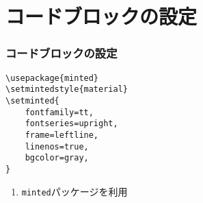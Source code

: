 \section{コードブロックの設定}
\begin{frame}[fragile]
    \frametitle{コードブロックの設定}
    \begin{verbatim}
\usepackage{minted}
\setmintedstyle{material}
\setminted{
    fontfamily=tt,
    fontseries=upright,
    frame=leftline,
    linenos=true,
    bgcolor=gray,
}
    \end{verbatim}

\begin{enumerate}
    \item \texttt{minted}パッケージを利用
\end{enumerate}
\end{frame}
